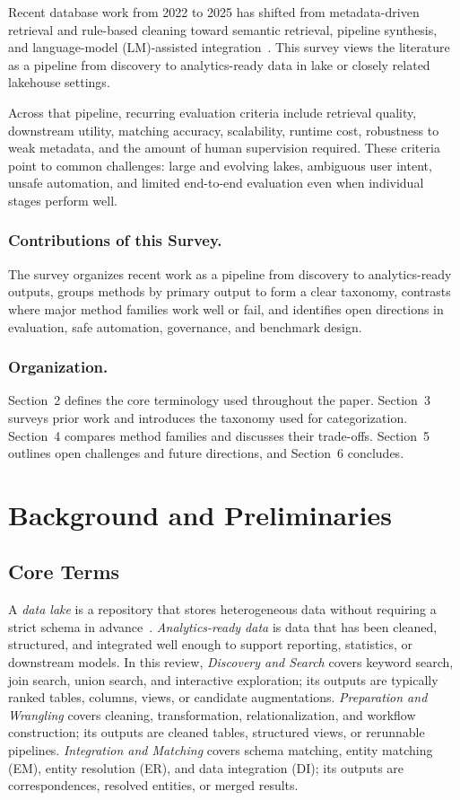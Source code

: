 \documentclass[sigconf]{acmart}
\begin{document}
Recent database work from 2022 to 2025 has shifted from metadata-driven retrieval and rule-based cleaning toward semantic retrieval, pipeline synthesis, and language-model (LM)-assisted integration~\cite{10.14778/3587136.3587146,10.14778/3603581.3603587,10.1145/3698831,10.14778/3742728.3742757}. This survey views the literature as a pipeline from discovery to analytics-ready data in lake or closely related lakehouse settings.

Across that pipeline, recurring evaluation criteria include retrieval quality, downstream utility, matching accuracy, scalability, runtime cost, robustness to weak metadata, and the amount of human supervision required. These criteria point to common challenges: large and evolving lakes, ambiguous user intent, unsafe automation, and limited end-to-end evaluation even when individual stages perform well.

\subsubsection*{Contributions of this Survey.}
The survey organizes recent work as a pipeline from discovery to analytics-ready outputs, groups methods by primary output to form a clear taxonomy, contrasts where major method families work well or fail, and identifies open directions in evaluation, safe automation, governance, and benchmark design.

\subsubsection*{Organization.}
Section~2 defines the core terminology used throughout the paper. Section~3 surveys prior work and introduces the taxonomy used for categorization. Section~4 compares method families and discusses their trade-offs. Section~5 outlines open challenges and future directions, and Section~6 concludes.

\section{Background and Preliminaries}
\subsection{Core Terms}
A \emph{data lake} is a repository that stores heterogeneous data without requiring a strict schema in advance~\cite{10.1145/3555041.3589409,10.14778/3750601.3750694}. \emph{Analytics-ready data} is data that has been cleaned, structured, and integrated well enough to support reporting, statistics, or downstream models. In this review, \emph{Discovery and Search} covers keyword search, join search, union search, and interactive exploration; its outputs are typically ranked tables, columns, views, or candidate augmentations. \emph{Preparation and Wrangling} covers cleaning, transformation, relationalization, and workflow construction; its outputs are cleaned tables, structured views, or rerunnable pipelines. \emph{Integration and Matching} covers schema matching, entity matching (EM), entity resolution (ER), and data integration (DI); its outputs are correspondences, resolved entities, or merged results.
\end{document}

